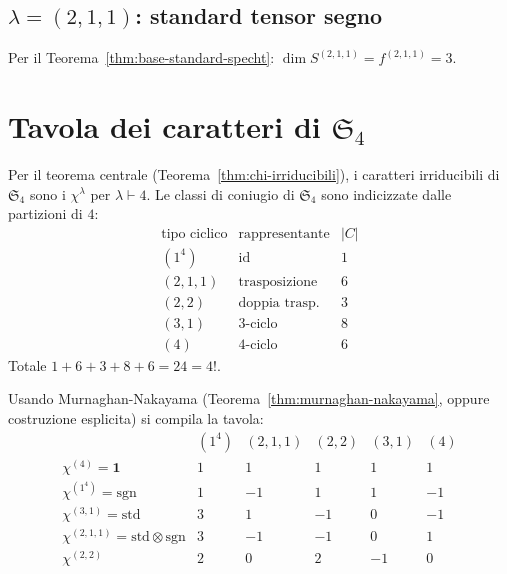 
\subsection{$ \lambda = (2,1,1) $: standard tensor segno}

Per il Teorema~\ref{thm:base-standard-specht}: $ \dim S^{(2,1,1)} = f^{(2,1,1)} = 3 $.


\section{Tavola dei caratteri di $ \mathfrak{S}_4 $}

Per il teorema centrale (Teorema~\ref{thm:chi-irriducibili}), i caratteri irriducibili di
$ \mathfrak{S}_4 $ sono i $ \chi^\lambda $ per $ \lambda \vdash 4 $. Le classi di coniugio di
$ \mathfrak{S}_4 $ sono indicizzate dalle partizioni di $ 4 $:
\[
  \begin{array}{c|c|c}
    \text{tipo ciclico} & \text{rappresentante} & |C| \\ \hline
    (1^4) & \mathrm{id} & 1 \\
    (2,1,1) & \text{trasposizione} & 6 \\
    (2,2) & \text{doppia trasp.} & 3 \\
    (3,1) & 3\text{-ciclo} & 8 \\
    (4) & 4\text{-ciclo} & 6
  \end{array}
\]
Totale $ 1 + 6 + 3 + 8 + 6 = 24 = 4! $.

Usando Murnaghan-Nakayama (Teorema~\ref{thm:murnaghan-nakayama}, oppure costruzione esplicita)
si compila la tavola:
\[
  \begin{array}{c|ccccc}
    & (1^4) & (2,1,1) & (2,2) & (3,1) & (4) \\ \hline
    \chi^{(4)} = \mathbf{1} & 1 & 1 & 1 & 1 & 1 \\
    \chi^{(1^4)} = \mathrm{sgn} & 1 & -1 & 1 & 1 & -1 \\
    \chi^{(3,1)} = \mathrm{std} & 3 & 1 & -1 & 0 & -1 \\
    \chi^{(2,1,1)} = \mathrm{std} \otimes \mathrm{sgn} & 3 & -1 & -1 & 0 & 1 \\
    \chi^{(2,2)} & 2 & 0 & 2 & -1 & 0
  \end{array}
\]

